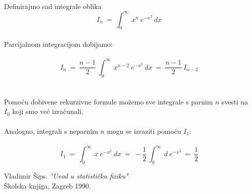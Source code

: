 \documentclass[a4paper,12pt]{article}
\begin{document}
\\
Definirajmo sad integrale oblika
\\
$$ I_n\ =\ \int_{0}^{\infty}\ x^n\ e^{-x^2}\ dx $$
\\
Parcijalnom integracijom dobijamo:
\\
\\
$$ I_n\ =\ \frac{n-1}{2}\ \int_{0}^{\infty}\ x^{n-2}\ e^{-x^2}\ dx\ =\ \frac{n-1}{2}\ I_{n-2} $$
\\
\\
Pomo\'cu dobivene rekurzivne formule mo\v{z}emo sve integrale s parnim $n$ svesti na $I_0$ koji smo ve\'c izra\v{c}unali.
\\
\\
Analogno, integrali s neparnim $n$ mogu se izraziti pomo\'cu $I_1$:
\\
\\
$$ I_1\ =\ \int_{0}^{\infty}\ x\ e^{-x^2}\ dx\ =\ -\frac{1}{2}\ \int_{0}^{\infty}\ d\ e^{-x^2}\ =\ \frac{1}{2} $$

\newpage
\begin{thebibliography}{11}
		Vladimir \v{S}ips.
		\textit{"Uvod u statisti\v{c}ku fiziku"} \\
		\v{S}kolska knjiga, Zagreb 1990.
\end{thebibliography}
\end{document}
